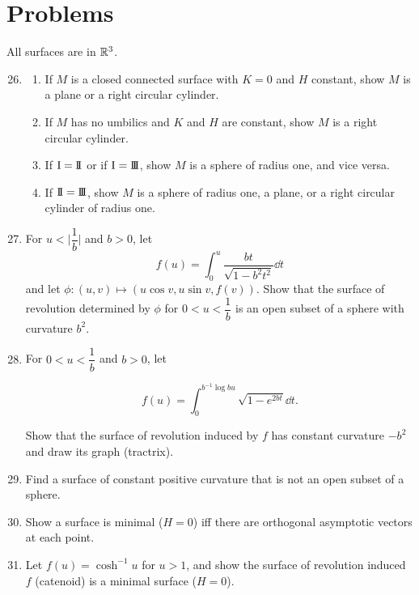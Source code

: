 \documentclass[../main]{subfiles}
\begin{document}
\section*{Problems}
All surfaces are in $\mathbb{R}^3$.
\begin{enumerate}
    \setcounter{enumi}{25}
    \item\label{pro:26}
    \begin{enumerate}[label = (\roman*)]
        \item If $M$ is a closed connected surface with $K = 0$ and $H$ constant, show $M$ is a plane or a right circular cylinder. 
        \item If $M$ has no umbilics and $K$ and $H$ are constant, show $M$ is a right circular cylinder.
        \item If $\mathrm{I} = \mathrm{I\!I}$ or if $\mathrm{I} = \mathrm{I\!I\!I}$, show $M$ is a sphere of radius one, and vice versa.
        \item If $\mathrm{I\!I} = \mathrm{I\!I\!I}$, show $M$ is a sphere of radius one, a plane, or a right circular cylinder of radius one.
    \end{enumerate}
      
    
    \item\label{pro:27} For $u < \Big|\dfrac{1}{b}\Big|$ and $b > 0$, let 
    \[f(u) = \int_0^u \frac {b t} {\sqrt{1 - b^2 t^2}} \dd t\] 
    and let $\phi : (u, v) \mapsto (u \cos v, u \sin v, f(v))$. Show that the surface of revolution determined by $\phi$ for $0 < u < \dfrac{1}{b}$ is an open subset of a sphere with curvature $b^2$. 
    
    \item\label{pro:28} For $0 < u < \dfrac{1}{b}$ and $b > 0$, let 
    
    \[f(u) = \int_0^{b^{-1} \log b u} \sqrt {1 - e^{2 bt}} \dd t.\]
    
    Show that the surface of revolution induced by $f$ has constant curvature $-b^2$ and draw its graph (tractrix). 
    
    \item\label{pro:29} Find a surface of constant positive curvature that is not an open subset of a sphere.
    
    \item\label{pro:30} Show a surface is minimal ($H = 0$) iff there are orthogonal asymptotic vectors at each point.
    
    \item\label{pro:31} Let $f(u) = \cosh^{-1} u$ for $u > 1$, and show the surface of revolution induced $f$ (catenoid) is a minimal surface ($H = 0$).
\end{enumerate}
\end{document}
